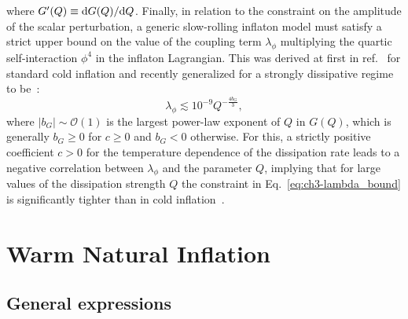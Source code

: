 where $G^\prime(Q)\equiv {\rm d}G(Q)/{\rm d}Q$. Finally, in relation to the constraint on the amplitude of the scalar perturbation, a generic slow-rolling inflaton model must satisfy a strict upper bound on the value of the coupling term $\lambda_\phi$ multiplying the quartic self-interaction $\phi^4$ in the inflaton Lagrangian. This was derived at first in ref.~\cite{Adams:1990pn} for standard cold inflation and recently generalized for a strongly dissipative regime to be~\cite{Montefalcone:2022owy}:
\begin{equation}
        \lambda_\phi \lesssim 10^{-9} Q^{-\frac{4b_G}{3}}, \label{eq:ch3-lambda_bound}
\end{equation}
where $|b_G|\sim\mathcal{O}(1)$ is the largest power-law exponent of $Q$ in $G(Q)$, which is generally $b_G \geq0$ for $c\geq0$ and $b_G <0$ otherwise. For this, a strictly positive coefficient $c>0$ for the temperature dependence of the dissipation rate leads to a negative correlation between $\lambda_\phi$ and the parameter $Q$, implying that for large values of the dissipation strength $Q$ the constraint in Eq.~\ref{eq:ch3-lambda_bound} is significantly tighter than in cold inflation~\cite{Montefalcone:2022owy}.

\section{Warm Natural Inflation \label{sec:ch3-3}}

\subsection{General expressions}
\label{sec:ch3-3.1}

